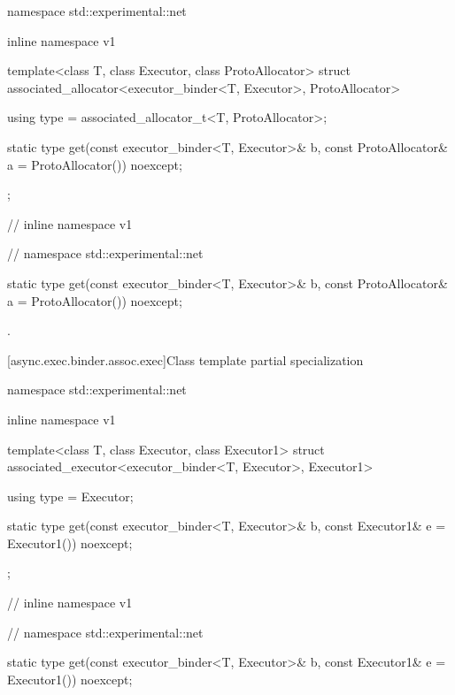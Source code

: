 %
%
\begin{codeblock}
namespace std::experimental::net {
inline namespace v1 {

  template<class T, class Executor, class ProtoAllocator>
    struct associated_allocator<executor_binder<T, Executor>, ProtoAllocator>
  {
    using type = associated_allocator_t<T, ProtoAllocator>;

    static type get(const executor_binder<T, Executor>& b,
                    const ProtoAllocator& a = ProtoAllocator()) noexcept;
  };

} // inline namespace v1
} // namespace std::experimental::net
\end{codeblock}

\begin{itemdecl}
static type get(const executor_binder<T, Executor>& b,
                const ProtoAllocator& a = ProtoAllocator()) noexcept;
\end{itemdecl}

\begin{itemdescr}
\pnum
\returns {}.
\end{itemdescr}



[async.exec.binder.assoc.exec]{Class template partial specialization }

%
%
\begin{codeblock}
namespace std::experimental::net {
inline namespace v1 {

  template<class T, class Executor, class Executor1>
    struct associated_executor<executor_binder<T, Executor>, Executor1>
  {
    using type = Executor;

    static type get(const executor_binder<T, Executor>& b,
                    const Executor1& e = Executor1()) noexcept;
  };

} // inline namespace v1
} // namespace std::experimental::net
\end{codeblock}

\begin{itemdecl}
static type get(const executor_binder<T, Executor>& b,
                const Executor1& e = Executor1()) noexcept;
\end{itemdecl}

